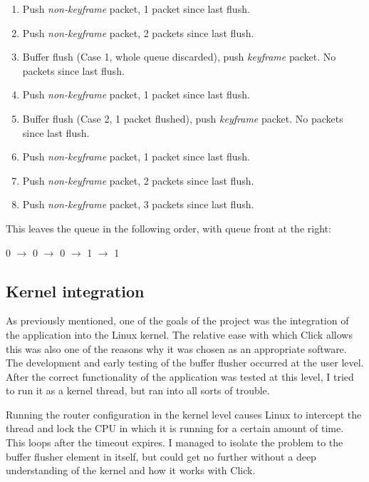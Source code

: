 \begin{enumerate}
\item{Push \textit{non-keyframe} packet, 1 packet since last flush.}
\item{Push \textit{non-keyframe} packet, 2 packets since last flush.}
\item{Buffer flush (Case 1, whole queue discarded), push \textit{keyframe} packet. No packets since last flush.}
\item{Push \textit{non-keyframe} packet, 1 packet since last flush.}
\item{Buffer flush (Case 2, 1 packet flushed), push \textit{keyframe} packet. No packets since last flush.}
\item{Push \textit{non-keyframe} packet, 1 packet since last flush.}
\item{Push \textit{non-keyframe} packet, 2 packets since last flush.}
\item{Push \textit{non-keyframe} packet, 3 packets since last flush.}
\end{enumerate}

This leaves the queue in the following order, with queue front at the right:

\begin{center}
0 $\rightarrow$ 0 $\rightarrow$ 0 $\rightarrow$ 1 $\rightarrow$ 1
\end{center}

\subsection{Kernel integration}

As previously mentioned, one of the goals of the project was the integration of the application into the Linux kernel. The relative ease with which Click allows this was also one of the reasons why it was chosen as an appropriate software. The development and early testing of the buffer flusher occurred at the user level. After the correct functionality of the application was tested at this level, I tried to run it as a kernel thread, but ran into all sorts of trouble.

Running the router configuration in the kernel  level causes Linux to intercept the thread and lock the CPU in which it is running for a certain amount of time. This loops after the timeout expires. I managed to isolate the problem to the buffer flusher element in itself, but could get no further without a deep understanding of the kernel and how it works with Click.

